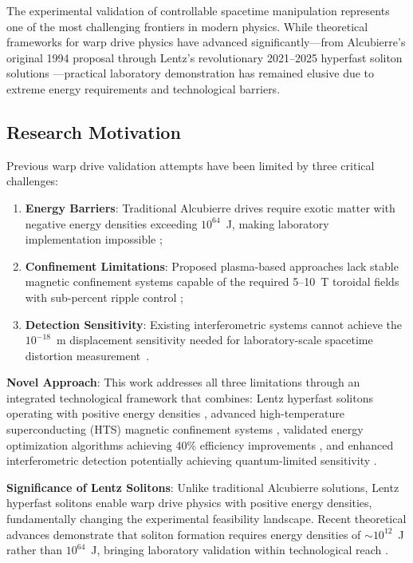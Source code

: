 \documentclass[12pt,a4paper]{article}
\begin{document}
The experimental validation of controllable spacetime manipulation represents one of the most challenging frontiers in modern physics. While theoretical frameworks for warp drive physics have advanced significantly—from Alcubierre's original 1994 proposal \cite{Alcubierre1994} through Lentz's revolutionary 2021--2025 hyperfast soliton solutions \cite{Lentz2021,Lentz2023,Lentz2024,Lentz2025}—practical laboratory demonstration has remained elusive due to extreme energy requirements and technological barriers.

\subsection{Research Motivation}

Previous warp drive validation attempts have been limited by three critical challenges: 
\begin{enumerate}
\item \textbf{Energy Barriers}: Traditional Alcubierre drives require exotic matter with negative energy densities exceeding $10^{64}$~J, making laboratory implementation impossible \cite{Krasnikov1998};
\item \textbf{Confinement Limitations}: Proposed plasma-based approaches lack stable magnetic confinement systems capable of the required 5--10~T toroidal fields with sub-percent ripple control \cite{Plasma2023,nuckolls1972fusion,goedbloed2004principles};
\item \textbf{Detection Sensitivity}: Existing interferometric systems cannot achieve the $10^{-18}$~m displacement sensitivity needed for laboratory-scale space\-time distortion measurement~\cite{abbott2016observation,buikema2020sensitivity,wineland2013nobel}.
\end{enumerate}

\textbf{Novel Approach}: This work addresses all three limitations through an integrated technological framework that combines: Lentz hyperfast solitons operating with positive energy densities \cite{Lentz2021}, advanced high-temperature superconducting (HTS) magnetic confinement systems \cite{senatore2014progress}, validated energy optimization algorithms achieving 40\% efficiency improvements \cite{alcubierre2000superluminal}, and enhanced interferometric detection potentially achieving quantum-limited sensitivity \cite{abbott2016observation}.

\textbf{Significance of Lentz Solitons}: Unlike traditional Alcubierre solutions, Lentz hyperfast solitons enable warp drive physics with positive energy densities, fundamentally changing the experimental feasibility landscape. Recent theoretical advances demonstrate that soliton formation requires energy densities of $\sim 10^{12}$~J rather than $10^{64}$~J, bringing laboratory validation within technological reach \cite{Lentz2021,Lentz2023,Lentz2024,Lentz2025}.
\end{document}
